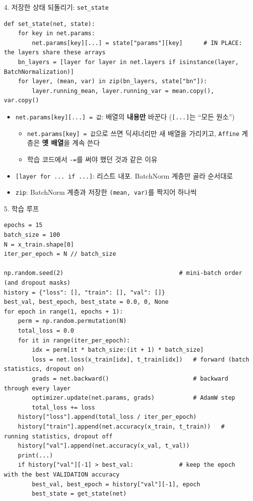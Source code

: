 \documentclass[aspectratio=169,11pt]{beamer}
\newcommand{\codesmall}{\ttfamily\fontsize{7.4}{8.3}\selectfont}
\newcommand{\code}[1]{\texttt{#1}}
\begin{document}
\begin{frame}[fragile]{4. 저장한 상태 되돌리기: \code{set\_state}}
\begin{lstlisting}
def set_state(net, state):
    for key in net.params:
        net.params[key][...] = state["params"][key]      # IN PLACE: the layers share these arrays
    bn_layers = [layer for layer in net.layers if isinstance(layer, BatchNormalization)]
    for layer, (mean, var) in zip(bn_layers, state["bn"]):
        layer.running_mean, layer.running_var = mean.copy(), var.copy()
\end{lstlisting}
\begin{itemize}
\item \code{net.params[key][...] = 값}: 배열의 \textbf{내용만} 바꾼다 (\code{[...]}는 ``모든 원소'')
\begin{itemize}
\item \code{net.params[key] = 값}으로 쓰면 딕셔너리만 새 배열을 가리키고, \code{Affine} 계층은 \textbf{옛 배열}을 계속 쓴다
\item 학습 코드에서 \code{-=}를 써야 했던 것과 같은 이유
\end{itemize}
\item \code{[layer for ... if ...]}: 리스트 내포. BatchNorm 계층만 골라 순서대로
\item \code{zip}: BatchNorm 계층과 저장한 \code{(mean, var)}를 짝지어 하나씩
\end{itemize}
\end{frame}

\begin{frame}{5. 학습 루프}
\small
\begin{lstlisting}[basicstyle=\codesmall]
epochs = 15
batch_size = 100
N = x_train.shape[0]
iter_per_epoch = N // batch_size

np.random.seed(2)                                 # mini-batch order (and dropout masks)
history = {"loss": [], "train": [], "val": []}
best_val, best_epoch, best_state = 0.0, 0, None
for epoch in range(1, epochs + 1):
    perm = np.random.permutation(N)
    total_loss = 0.0
    for it in range(iter_per_epoch):
        idx = perm[it * batch_size:(it + 1) * batch_size]
        loss = net.loss(x_train[idx], t_train[idx])   # forward (batch statistics, dropout on)
        grads = net.backward()                        # backward through every layer
        optimizer.update(net.params, grads)           # AdamW step
        total_loss += loss
    history["loss"].append(total_loss / iter_per_epoch)
    history["train"].append(net.accuracy(x_train, t_train))   # running statistics, dropout off
    history["val"].append(net.accuracy(x_val, t_val))
    print(...)
    if history["val"][-1] > best_val:             # keep the epoch with the best VALIDATION accuracy
        best_val, best_epoch = history["val"][-1], epoch
        best_state = get_state(net)
\end{lstlisting}
\end{frame}
\end{document}
